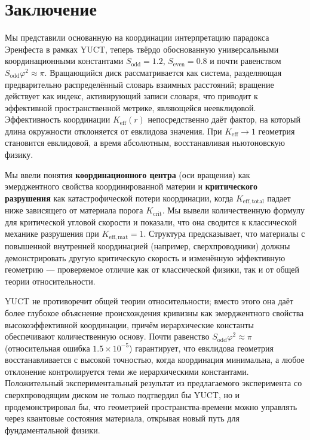\documentclass[12pt,a4paper]{article}
\newcommand{\Sodd}{S_{\mathrm{odd}}}
\newcommand{\Seven}{S_{\mathrm{even}}}
\begin{document}
	\section{Заключение}
	\label{sec:conclusion}
	
	Мы представили основанную на координации интерпретацию парадокса Эренфеста в рамках YUCT, теперь твёрдо обоснованную универсальными координационными константами \(\Sodd = 1.2\), \(\Seven = 0.8\) и почти равенством \(\Sodd \varphi^2 \approx \pi\). Вращающийся диск рассматривается как система, разделяющая предварительно распределённый словарь взаимных расстояний; вращение действует как индекс, активирующий записи словаря, что приводит к эффективной пространственной метрике, являющейся неевклидовой. Эффективность координации \(K_{\mathrm{eff}}(r)\) непосредственно даёт фактор, на который длина окружности отклоняется от евклидова значения. При \(K_{\mathrm{eff}} \to 1\) геометрия становится евклидовой, а время абсолютным, восстанавливая ньютоновскую физику.
	
	Мы ввели понятия \textbf{координационного центра} (оси вращения) как эмерджентного свойства координированной материи и \textbf{критического разрушения} как катастрофической потери координации, когда \(K_{\mathrm{eff,total}}\) падает ниже зависящего от материала порога \(K_{\mathrm{crit}}\). Мы вывели количественную формулу для критической угловой скорости и показали, что она сводится к классической механике разрушения при \(K_{\mathrm{eff,mat}}=1\). Структура предсказывает, что материалы с повышенной внутренней координацией (например, сверхпроводники) должны демонстрировать другую критическую скорость и изменённую эффективную геометрию — проверяемое отличие как от классической физики, так и от общей теории относительности.
	
	YUCT не противоречит общей теории относительности; вместо этого она даёт более глубокое объяснение происхождения кривизны как эмерджентного свойства высокоэффективной координации, причём иерархические константы обеспечивают количественную основу. Почти равенство \(\Sodd \varphi^2 \approx \pi\) (относительная ошибка \(1.5\times10^{-5}\)) гарантирует, что евклидова геометрия восстанавливается с высокой точностью, когда координация минимальна, а любое отклонение контролируется теми же иерархическими константами. Положительный экспериментальный результат из предлагаемого эксперимента со сверхпроводящим диском не только подтвердил бы YUCT, но и продемонстрировал бы, что геометрией пространства-времени можно управлять через квантовые состояния материала, открывая новый путь для фундаментальной физики.
	
\end{document}
